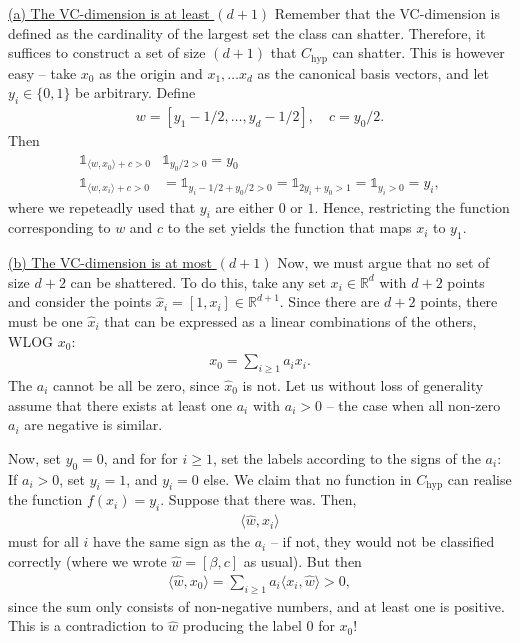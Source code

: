 \documentclass{article}
\newcommand{\sprod}[1]{\langle #1 \rangle}
\newcommand{\R}{\mathbb{R}}
\newcommand{\one}{\mathds{1}}
\begin{document}
\underline{(a) The VC-dimension is at least $(d+1)$} Remember that the VC-dimension is defined as the cardinality of the largest set the class can shatter. Therefore, it suffices to construct a set of size $(d+1)$ that $C_{\mathrm{hyp}}$ can shatter. This is however easy -- take $x_0$ as the origin and $x_1, \dots x_d$ as the canonical basis vectors, and let $y_i \in \{0,1\}$ be arbitrary. Define
\begin{align*}
    w = [y_1-1/2, \dots, y_d-1/2], \quad  c = y_0/2.
\end{align*}
Then
\begin{align*}
    \one_{\sprod{w,x_0}+c>0} &  \one_{y_0/2>0} = y_0 \\
    \one_{\sprod{w,x_i}+c>0} &=  \one_{y_i -1/2 +  y_0/2>0} = \one_{2y_i + y_0>1} = \one_{y_i >0} = y_i,
\end{align*}
where we repeteadly used that $y_i$ are either $0$ or $1$. Hence, restricting the function corresponding to $w$ and $c$ to the set yields the function that maps $x_i$ to $y_1$.

\underline{(b) The VC-dimension is at most $(d+1)$} Now, we must argue that no set of size $d+2$ can be shattered. To do this, take any set $x_i \in \R^d$ with $d+2$ points and consider the points $\hat{x}_i = [1,x_i] \in \R^{d+1}$. Since there are $d+2$ points, there must be one $\hat{x}_i$ that can be expressed as a linear combinations of the others, WLOG $x_0$:
\begin{align*}
    x_0 = \sum_{i\geq 1} a_i x_i.
\end{align*}
The $a_i$ cannot be all be zero, since $\hat{x}_0$ is not. Let us without loss of generality assume that there exists at least one $a_i$ with $a_i>0$ -- the case when all non-zero $a_i$ are negative is similar.


Now, set $y_0= 0$, and for for $i \geq 1$, set the labels according to the signs of the $a_i$: If $a_i>0$, set $y_i=1$, and $y_i=0$ else. We claim that no function in $C_{\mathrm{hyp}}$ can realise the function $f(x_i)=y_i$. Suppose that there was. Then, 
\begin{align*}
  \sprod{\hat{w},x_i}
\end{align*}
must for all $i$ have the same sign as the $a_i$ -- if not, they would not be classified correctly (where we wrote $\hat{w}=[\beta,c]$ as usual). But then
\begin{align*}
   \sprod{\hat{w},x_0} = \sum_{i\geq 1} a_i \sprod{x_i,\hat{w}} >0,
\end{align*}
since the sum only consists of non-negative numbers, and at least one is positive. This is a contradiction to $\hat{w}$ producing the label $0$ for $x_0$!
\end{document}
